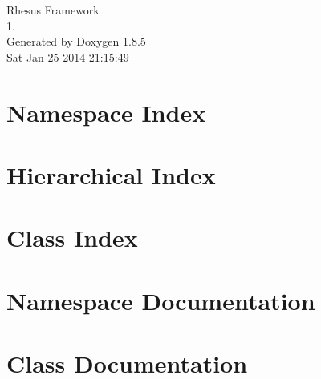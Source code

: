 \documentclass[twoside]{book}
\newcommand{\clearemptydoublepage}{%
  \newpage{\pagestyle{empty}\cleardoublepage}%
}
\begin{document}
\hypersetup{pageanchor=false}
\begin{titlepage}
\vspace*{7cm}
\begin{center}%
{\Large Rhesus Framework \\[1ex]\large 1. }\\
\vspace*{1cm}
{\large Generated by Doxygen 1.8.5}\\
\vspace*{0.5cm}
{\small Sat Jan 25 2014 21:15:49}\\
\end{center}
\end{titlepage}
\clearemptydoublepage
\tableofcontents
\clearemptydoublepage
{}
\hypersetup{pageanchor=true}

\chapter{Namespace Index}

\chapter{Hierarchical Index}

\chapter{Class Index}

\chapter{Namespace Documentation}

\chapter{Class Documentation}















\newpage
{}
{}
\printindex
\end{document}
